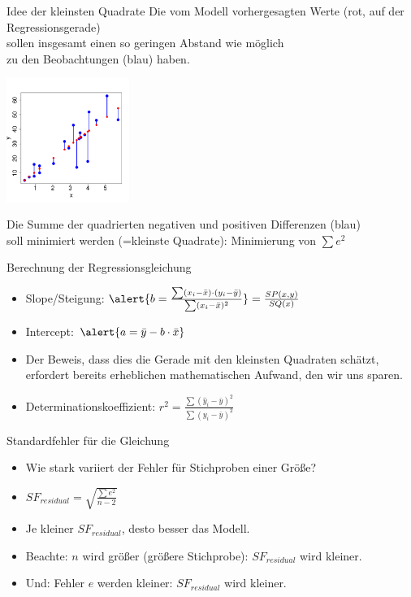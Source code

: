 \begin{frame}
  {Idee der kleinsten Quadrate}
  Die vom Modell vorhergesagten Werte (rot, auf der Regressionsgerade)\\
  sollen insgesamt einen so geringen Abstand wie möglich\\
  zu den Beobachtungen (blau) haben.
  \vspace{-0.5cm}
  \begin{center}
    \includegraphics[width=0.3\textwidth]{graphics/lmerrors}
  \end{center}
  \pause
  Die Summe der \alert{quadrierten} negativen und positiven Differenzen (blau)\\
  soll \alert{minimiert} werden (=kleinste Quadrate): Minimierung von \alert{$\sum e^2$}
\end{frame}

\begin{frame}
  {Berechnung der Regressionsgleichung}
  \begin{itemize}[<+->]
    \item Slope\slash Steigung: $\alert{b=\frac{\sum(x_i-\bar{x})\cdot(y_i-\bar{y})}{\sum(x_i-\bar{x})^2}}=\frac{SP(x,y)}{SQ(x)}$
      \vspace{0.5cm}
    \item Intercept: $\alert{a=\bar{y}-b\cdot\bar{x}}$
      \vspace{0.5cm}
    \item Der Beweis, dass dies die Gerade mit den kleinsten Quadraten schätzt,
      erfordert bereits erheblichen mathematischen Aufwand, den wir uns sparen.
      \vspace{0.5cm}
    \item Determinationskoeffizient: \alert{$r^2=\frac{\sum(\hat{y}_i-\bar{y})^2}{\sum(y_i-\bar{y})^2}$}
    \end{itemize}
\end{frame}

\begin{frame}
  {Standardfehler für die Gleichung}
  \begin{itemize}[<+->]
    \item Wie stark variiert der Fehler für Stichproben einer Größe?
      \vspace{0.5cm}
    \item \alert{$SF_{residual}=\sqrt{\frac{\sum e^2}{n-2}}$}
      \vspace{0.5cm}
    \item Je kleiner $SF_{residual}$, desto besser das Modell.
    \item Beachte: $n$ wird größer (größere Stichprobe): $SF_{residual}$ wird kleiner.
    \item Und: Fehler $e$ werden kleiner: $SF_{residual}$ wird kleiner.
  \end{itemize}
\end{frame}

